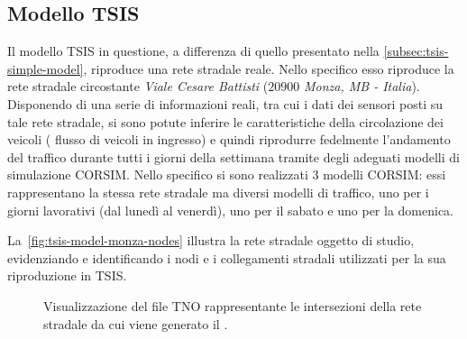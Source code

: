 \subsection{Modello TSIS}\label{subsec:tsis-monza-model}
Il modello \acs{TSIS} in questione, a differenza di quello presentato nella \autoref{subsec:tsis-simple-model}, riproduce una rete stradale reale. Nello specifico esso riproduce la rete stradale circostante \emph{Viale Cesare Battisti} ($20900$ \emph{Monza, MB - Italia}). Disponendo di una serie di informazioni reali, tra cui i dati dei sensori posti su tale rete stradale, si sono potute inferire le caratteristiche della circolazione dei veicoli (\eg{} flusso di veicoli in ingresso) e quindi riprodurre fedelmente l'andamento del traffico durante tutti i giorni della settimana tramite degli adeguati modelli di simulazione \acs{CORSIM}. Nello specifico si sono realizzati $3$ modelli \acs{CORSIM}: essi rappresentano la stessa rete stradale ma diversi modelli di traffico, uno per i giorni lavorativi (dal lunedì al venerdì), uno per il sabato e uno per la domenica.

La~\vref{fig:tsis-model-monza-nodes} illustra la rete stradale oggetto di studio, evidenziando e identificando i nodi e i collegamenti stradali utilizzati per la sua riproduzione in \acs{TSIS}.
\begin{figure}
  \centering
  \captionsetup[subfigure]{labelformat=empty}
  \label{fig:tsis-model-monza-nodes}
\end{figure}
\begin{figure}
  \centering
  \captionsetup{type=figure}
  \captionsetup[subfigure]{labelformat=empty}
  \caption[Intersezioni della rete stradale del ]{Visualizzazione del file \acs{TNO} rappresentante le intersezioni della rete stradale da cui viene generato il .}
\end{figure}

